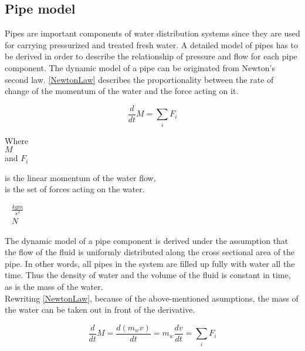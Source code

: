 \subsection{Pipe model} 
\label{PipeModel}
Pipes are important components of water distribution systems since they are used for carrying pressurized and treated fresh water. A detailed model of pipes has to be derived in order to describe the relationship of pressure and flow for each pipe component.  
%
The dynamic model of a pipe can be originated from Newton's second law. \eqref{NewtonLaw} describes the proportionality between the rate of change of the momentum of the water and the force acting on it.

\begin{equation}
  \frac{d}{dt} M = \sum_i F_i
  \label{NewtonLaw}
\end{equation} 

\begin{minipage}[t]{0.20\textwidth}
Where\\
\hspace*{8mm} $M$ \\
and \hspace*{0.7mm}  $F_i$ 
\end{minipage}
\begin{minipage}[t]{0.68\textwidth}
\vspace*{2mm}
is the linear momentum of the water flow,\\
is the set of forces acting on the water.
\end{minipage}
\begin{minipage}[t]{0.10\textwidth}
\vspace*{2mm}
\textcolor{White}{te}$\unit{\frac{kgm}{s^2}}$\\
\textcolor{White}{te}$\unit{N}$
\end{minipage}

The dynamic model of a pipe component is derived under the assumption that the flow of the fluid is uniformly distributed along the cross sectional area of the pipe. In other words, all pipes in the system are filled up fully with water all the time. Thus the density of water and the volume of the fluid is constant in time, as is the mass of the water.
\\
Rewriting \eqref{NewtonLaw}, because of the above-mentioned asumptions, the mass of the water can be taken out in front of the derivative.

\begin{equation}
  \frac{d}{dt} M = {\frac{d(m_w v)}{dt}} = m_w \frac{dv}{dt} = \sum_i F_i
\end{equation} 


